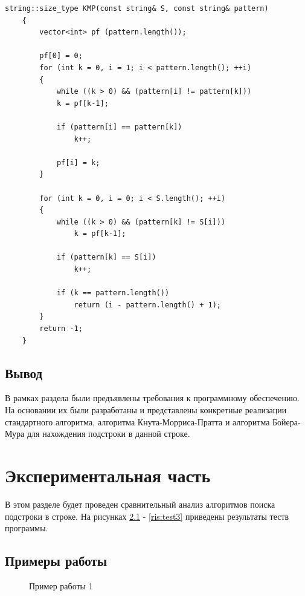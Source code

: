\documentclass[a4paper,12pt]{report}
\begin{document}
	        \begin{lstlisting}[frame = single, breaklines, label = list:kmp, caption = Алгоритм Кнута-Морриса-Пратта]
	string::size_type KMP(const string& S, const string& pattern)
	{
	    vector<int> pf (pattern.length());
	
	    pf[0] = 0;
	    for (int k = 0, i = 1; i < pattern.length(); ++i)
	    {
	        while ((k > 0) && (pattern[i] != pattern[k]))
	        k = pf[k-1];
	
	        if (pattern[i] == pattern[k])
	            k++;
	
	        pf[i] = k;
	    }
	
	    for (int k = 0, i = 0; i < S.length(); ++i)
	    {
	        while ((k > 0) && (pattern[k] != S[i]))
	            k = pf[k-1];
	
	        if (pattern[k] == S[i])
	            k++;
	
	        if (k == pattern.length())
	            return (i - pattern.length() + 1);
	    }
	    return -1;
	}
	        \end{lstlisting}
	      
	\section{Вывод}
	
		В рамках раздела были предъявлены требования к программному обеспечению. 
		На основании их были разработаны и представлены конкретные реализации стандартного алгоритма, алгоритма Кнута-Морриса-Пратта и алгоритма Бойера-Мура для нахождения подстроки в данной строке.      
	        
    \newpage

    \chapter{Экспериментальная часть}
        \label{sec:experimental_part}

			В этом разделе будет проведен сравнительный анализ алгоритмов поиска подстроки в строке. 
			На рисунках \ref{ris:test1} - \ref{ris:test3} приведены результаты теств программы.

	\section{Примеры работы}

		\begin{figure}[h!]
			\caption{Пример работы 1}
			\label{ris:test1}
		\end{figure}
	
\end{document}
